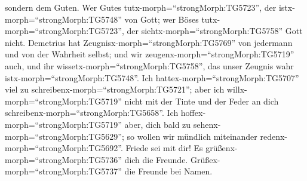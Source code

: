 sondern dem Guten. Wer Gutes tutx-morph=``strongMorph:TG5723'', der
istx-morph=``strongMorph:TG5748'' von Gott; wer Böses
tutx-morph=``strongMorph:TG5723'', der
siehtx-morph=``strongMorph:TG5758'' Gott nicht.  Demetrius
hat Zeugnisx-morph=``strongMorph:TG5769'' von jedermann und von der
Wahrheit selbst; und wir zeugenx-morph=``strongMorph:TG5719'' auch, und
ihr wissetx-morph=``strongMorph:TG5758'', das unser Zeugnis wahr
istx-morph=``strongMorph:TG5748''.  Ich
hattex-morph=``strongMorph:TG5707'' viel zu
schreibenx-morph=``strongMorph:TG5721''; aber ich
willx-morph=``strongMorph:TG5719'' nicht mit der Tinte und der Feder an
dich schreibenx-morph=``strongMorph:TG5658''.  Ich
hoffex-morph=``strongMorph:TG5719'' aber, dich bald zu
sehenx-morph=``strongMorph:TG5629''; so wollen wir mündlich miteinander
redenx-morph=``strongMorph:TG5692''. Friede sei mit dir! Es
grüßenx-morph=``strongMorph:TG5736'' dich die Freunde.
Grüßex-morph=``strongMorph:TG5737'' die Freunde bei Namen.
